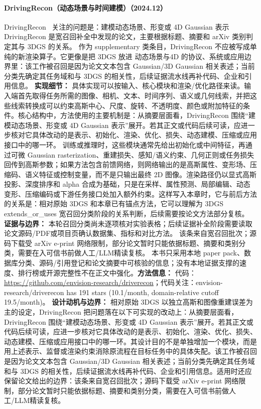 \paragraph{DrivingRecon（动态场景与时间建模）（2024.12）}
DrivingRecon~\cite{2412_09043} 关注的问题是：建模动态场景、形变或 4D Gaussian 表示 DrivingRecon 是宽召回补全中发现的论文，主要根据标题、摘要和 arXiv 类别判定其与 3DGS 的关系。
作为 supplementary 类条目，DrivingRecon 不应被写成单纯的新渲染算子。它更像是把 3DGS 放进 动态场景与4D 的协议、系统或应用边界里：该工作被召回是因为论文文本包含 Gaussian/3D Gaussian 相关表述；当前分类先确定其任务域和与 3DGS 的相关性，后续证据流水线再补代码、企业和引用信息。
\textbf{实现细节：} 具体实现可以按输入、核心模块和渲染/优化路径来读。输入端首先取得任务所需的图像、相机、文本、时间序列、语义或几何线索，并把这些线索转换成可以约束高斯中心、尺度、旋转、不透明度、颜色或附加特征的条件。核心结构中，方法使用的主要机制是：从摘要层面看，DrivingRecon 围绕“建模动态场景、形变或 4D Gaussian 表示”展开。若其正文或代码后续可读，应进一步核对它具体改动的是表示、初始化、渲染、优化、损失、动态建模、压缩或应用接口中的哪一环。 训练或推理时，这些模块通常先给出初始化或中间特征，再通过可微 Gaussian rasterization、重建损失、感知/语义约束、几何正则或任务损失回传到高斯参数；如果方法包含前馈网络，则网络输出的是高斯属性、变形场、压缩码、语义特征或控制变量，而不是只输出最终 2D 图像。渲染路径仍以显式高斯投影、深度排序和 alpha 合成为基础，只是在采样、属性预测、局部编辑、动态变形、压缩编码或下游任务接口处加入额外约束。这样写入本章时，它与前后方法的关系是：相对原始 3DGS 和本章已有锚点方法，它可以理解为 3DGS extends\_or\_uses 宽召回分类阶段的关系判断，后续需要按论文方法部分复核。
\textbf{证据与边界：} 本轮召回分类尚未逐项核对实验表格；后续证据补全阶段需要读取论文源码/PDF或项目页确认数据集、指标和对比方法。 该条来自宽召回批次；源码下载受 arXiv e-print 网络限制，部分论文暂时只能依据标题、摘要和类别分类，需要在入可信书前做人工/LLM精读复核。 本书只采用本地 paper pack、数据库分类、源码/引用登记和论文摘要中可核验的信息；没有本地证据支撑的速度、排行榜或开源完整性不在正文中强化。\textbf{方法信息：} 代码：\url{https://github.com/envision-research/driverecon}；代码关注：envision-research/driverecon has 191 stars (10.1/month, domain-relative cutoff 19.5/month)。
\textbf{设计动机与边界：} 相对原始 3DGS 以独立高斯和图像重建误差为主的设定，DrivingRecon 把问题落在以下可实现的改动上：从摘要层面看，DrivingRecon 围绕“建模动态场景、形变或 4D Gaussian 表示”展开。若其正文或代码后续可读，应进一步核对它具体改动的是表示、初始化、渲染、优化、损失、动态建模、压缩或应用接口中的哪一环。其设计目的不是单独增加一个模块，而是用上述表示、监督或渲染约束消除原流程在目标任务中的具体失配。该工作被召回是因为论文文本包含 Gaussian/3D Gaussian 相关表述；当前分类先确定其任务域和与 3DGS 的相关性，后续证据流水线再补代码、企业和引用信息。适用时还应保留论文给出的边界：该条来自宽召回批次；源码下载受 arXiv e-print 网络限制，部分论文暂时只能依据标题、摘要和类别分类，需要在入可信书前做人工/LLM精读复核。
